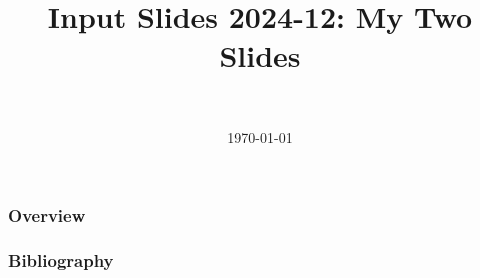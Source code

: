 \documentclass[]{beamer}
\title[Input Slides 2024-12]{Input Slides 2024-12: My Two Slides}
\author[Daniel Topa]{\TopaHII \\ \TopaHIIEmail}
\institute{\missiontech}
\date{\today}
\begin{document}
\begin{frame}
	\titlepage
\end{frame}

	

\begin{frame}\frametitle{Overview}
	\tableofcontents[hideallsubsections]
\end{frame}

	
	

{\tiny{
\begin{frame}[allowframebreaks]\frametitle{Bibliography}
	\printbibliography
\end{frame}}}

\begin{frame}
	\titlepage
\end{frame}
\end{document}
